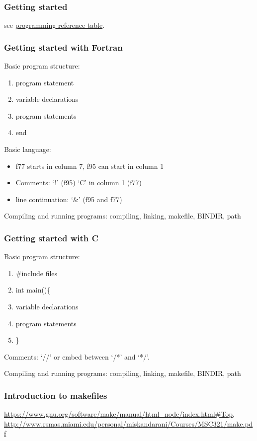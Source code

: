 \documentclass{article}
\begin{document}
\subsubsection{Getting started}
see \href{http://astronomy.nmsu.edu/holtz/a575/programming.html}
{programming reference table}.

\subsubsection{Getting started with Fortran}
Basic program structure:
\begin{enumerate}
    \item program statement
    \item variable declarations
    \item program statements
    \item end
\end{enumerate}
Basic language:
\begin{itemize}
    \item f77 starts in column 7, f95 can start in column 1
    \item Comments: `!' (f95) `C' in column 1 (f77)
    \item line continuation: `\&' (f95 and f77)
\end{itemize}
Compiling and running programs: compiling, linking, makefile, BINDIR,
path

\subsubsection{Getting started with C}
Basic program structure:
\begin{enumerate}
    \item \#include files
    \item int main()\{
    \item variable declarations
    \item program statements
    \item \}
\end{enumerate}
Comments: `//' or embed between `/*' and `*/'.

Compiling and running programs: compiling, linking, makefile, BINDIR, path
\subsubsection{Introduction to makefiles}
\url{https://www.gnu.org/software/make/manual/html_node/index.html#Top},
\url{http://www.rsmas.miami.edu/personal/miskandarani/Courses/MSC321/make.pdf}
\end{document}
